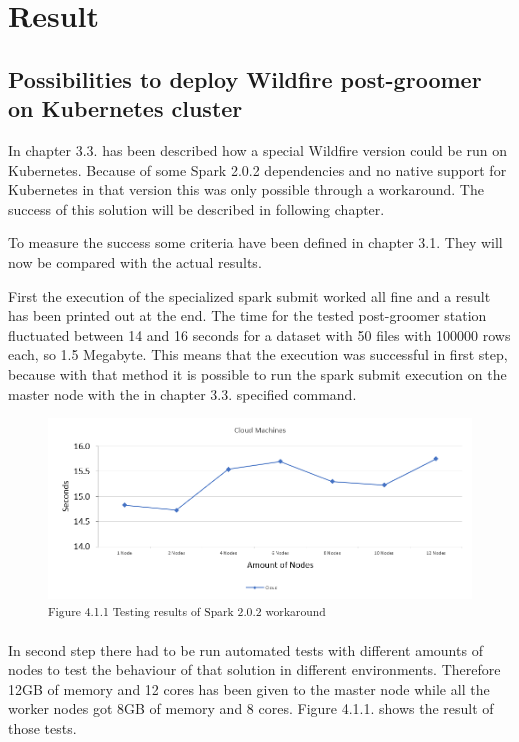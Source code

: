 
\chapter{Result}

\section{Possibilities to deploy Wildfire post-groomer on Kubernetes cluster}

In chapter 3.3. has been described how a special Wildfire version could be run on Kubernetes. Because of some Spark 2.0.2 dependencies and no native support for Kubernetes in that version this was only possible through a workaround. The success of this solution will be described in following chapter.

To measure the success some criteria have been defined in chapter 3.1. They will now be compared with the actual results.

First the execution of the specialized spark submit worked all fine and a result has been printed out at the end. The time for the tested post-groomer station fluctuated between 14 and 16 seconds for a dataset with 50 files with 100000 rows each, so 1.5 Megabyte. This means that the execution was successful in first step, because with that method it is possible to run the spark submit execution on the master node with the in chapter 3.3. specified command.

\begin{figure}[b]
\centering
\includegraphics[width=\textwidth/5*4]{images/workaround_testing_results.png}
\textsuperscript{Figure 4.1.1 Testing results of Spark 2.0.2 workaround}
\end{figure}

In second step there had to be run automated tests with different amounts of nodes to test the behaviour of that solution in different environments. Therefore 12GB of memory and 12 cores has been given to the master node while all the worker nodes got 8GB of memory and 8 cores. Figure 4.1.1. shows the result of those tests.

